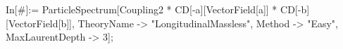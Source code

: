 In[#]:= ParticleSpectrum[Coupling2 * CD[-a][VectorField[a]] * CD[-b][VectorField[b]], TheoryName -> "LongitudinalMassless", Method -> "Easy", MaxLaurentDepth -> 3]; 